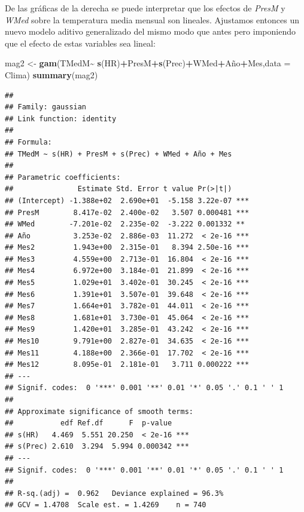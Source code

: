 \documentclass[12pt,a4paper,]{book}
\newenvironment{Shaded}{\begin{snugshade}}{\end{snugshade}}
\newcommand{\AttributeTok}[1]{\textcolor[rgb]{0.13,0.29,0.53}{#1}}
\newcommand{\FunctionTok}[1]{\textcolor[rgb]{0.13,0.29,0.53}{\textbf{#1}}}
\newcommand{\NormalTok}[1]{#1}
\newcommand{\OtherTok}[1]{\textcolor[rgb]{0.56,0.35,0.01}{#1}}
\newcommand{\SpecialCharTok}[1]{\textcolor[rgb]{0.81,0.36,0.00}{\textbf{#1}}}
\numberwithin{dummy}{section}
\theoremstyle{ocrenumbox}
\theoremstyle{blacknumex}
\theoremstyle{blacknumbox}
\theoremstyle{ocrenum}
\theoremstyle{ocrenum}
\begin{document}
De las gráficas de la derecha se puede interpretar que los efectos de
\emph{PresM} y \emph{WMed} sobre la temperatura media mensual son
lineales. Ajustamos entonces un nuevo modelo aditivo generalizado del
mismo modo que antes pero imponiendo que el efecto de estas variables
sea lineal:

\begin{Shaded}
\begin{Highlighting}[]
\NormalTok{mag2 }\OtherTok{\textless{}{-}} \FunctionTok{gam}\NormalTok{(TMedM}\SpecialCharTok{\textasciitilde{}} \FunctionTok{s}\NormalTok{(HR)}\SpecialCharTok{+}\NormalTok{PresM}\SpecialCharTok{+}\FunctionTok{s}\NormalTok{(Prec)}\SpecialCharTok{+}\NormalTok{WMed}\SpecialCharTok{+}\NormalTok{Año}\SpecialCharTok{+}\NormalTok{Mes,}\AttributeTok{data =}\NormalTok{ Clima)}
\FunctionTok{summary}\NormalTok{(mag2)}
\end{Highlighting}
\end{Shaded}

\begin{verbatim}
## 
## Family: gaussian 
## Link function: identity 
## 
## Formula:
## TMedM ~ s(HR) + PresM + s(Prec) + WMed + Año + Mes
## 
## Parametric coefficients:
##               Estimate Std. Error t value Pr(>|t|)    
## (Intercept) -1.388e+02  2.690e+01  -5.158 3.22e-07 ***
## PresM        8.417e-02  2.400e-02   3.507 0.000481 ***
## WMed        -7.201e-02  2.235e-02  -3.222 0.001332 ** 
## Año          3.253e-02  2.886e-03  11.272  < 2e-16 ***
## Mes2         1.943e+00  2.315e-01   8.394 2.50e-16 ***
## Mes3         4.559e+00  2.713e-01  16.804  < 2e-16 ***
## Mes4         6.972e+00  3.184e-01  21.899  < 2e-16 ***
## Mes5         1.029e+01  3.402e-01  30.245  < 2e-16 ***
## Mes6         1.391e+01  3.507e-01  39.648  < 2e-16 ***
## Mes7         1.664e+01  3.782e-01  44.011  < 2e-16 ***
## Mes8         1.681e+01  3.730e-01  45.064  < 2e-16 ***
## Mes9         1.420e+01  3.285e-01  43.242  < 2e-16 ***
## Mes10        9.791e+00  2.827e-01  34.635  < 2e-16 ***
## Mes11        4.188e+00  2.366e-01  17.702  < 2e-16 ***
## Mes12        8.095e-01  2.181e-01   3.711 0.000222 ***
## ---
## Signif. codes:  0 '***' 0.001 '**' 0.01 '*' 0.05 '.' 0.1 ' ' 1
## 
## Approximate significance of smooth terms:
##           edf Ref.df      F  p-value    
## s(HR)   4.469  5.551 20.250  < 2e-16 ***
## s(Prec) 2.610  3.294  5.994 0.000342 ***
## ---
## Signif. codes:  0 '***' 0.001 '**' 0.01 '*' 0.05 '.' 0.1 ' ' 1
## 
## R-sq.(adj) =  0.962   Deviance explained = 96.3%
## GCV = 1.4708  Scale est. = 1.4269    n = 740
\end{verbatim}
\end{document}
